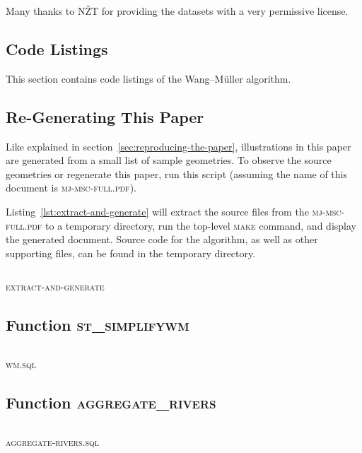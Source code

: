 \documentclass[a4paper]{article}
\newcommand{\WM}{Wang--M{\"u}ller}
\newcommand{\inputcode}[2]{\inputminted[fontsize=\small]{#1}{#2}}
\newenvironment{longlisting}{\captionsetup{type=listing}}{}
\begin{document}
Many thanks to NŽT\cite{nzt} for providing the datasets with a very permissive
license.

\printbibliography

\begin{appendices}

\section{Code Listings}

This section contains code listings of the {\WM} algorithm.

\subsection{Re-Generating This Paper}
\label{sec:code-regenerate}

Like explained in section~\ref{sec:reproducing-the-paper}, illustrations in
    this paper are generated from a small list of sample geometries. To observe
    the source geometries or regenerate this paper, run this script (assuming
    the name of this document is \textsc{mj-msc-full.pdf}).

    Listing~\ref{lst:extract-and-generate} will extract the source files from
    the \textsc{mj-msc-full.pdf} to a temporary directory, run the top-level
    \textsc{make} command, and display the generated document. Source code for
    the algorithm, as well as other supporting files, can be found in the
    temporary directory.

\begin{longlisting}
    \inputcode{bash}{extract-and-generate}
    \caption{\textsc{extract-and-generate}}
    \label{lst:extract-and-generate}
\end{longlisting}

\subsection{Function \textsc{st\_simplifywm}}
\begin{longlisting}
    \inputcode{postgresql}{wm.sql}
    \caption{\textsc{wm.sql}}
    \label{lst:wm.sql}
\end{longlisting}

\subsection{Function \textsc{aggregate\_rivers}}
\begin{longlisting}
    \inputcode{postgresql}{aggregate-rivers.sql}
    \caption{\textsc{aggregate-rivers.sql}}
    \label{lst:aggregate-rivers.sql}
\end{longlisting}

\end{appendices}
\end{document}
